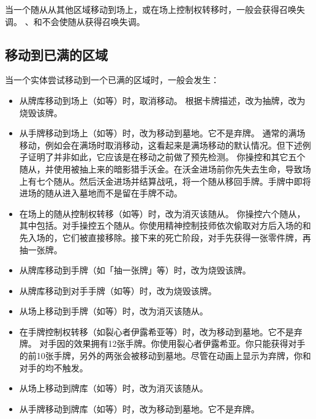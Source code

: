 当一个随从从其他区域移动到场上，或在场上控制权转移时，一般会获得召唤失调。
\exception {}、和不会使随从获得召唤失调。

\subsection{移动到已满的区域}
\label{move-to-full-zone}

当一个实体尝试移动到一个已满的区域时，一般会发生：

\begin{itemize}
    \item 从牌库移动到场上（如等）时，取消移动。
        \exception 根据卡牌描述，改为抽牌，改为烧毁该牌。
    \item 从手牌移动到场上（如等）时，改为移动到墓地。它不是弃牌。
        \notice 通常的满场移动，例如会在满场时取消移动，这看起来是满场移动的默认情况。但下述例子证明了并非如此，它应该是在移动之前做了预先检测。
        \example 你操控和其它五个随从，并使用被抽上来的暗影猎手沃金。在沃金进场前你先失去生命，导致场上有七个随从。然后沃金进场并结算战吼，将一个随从移回手牌。手牌中即将进场的随从进入墓地而不是留在手牌不动。
    \item 在场上的随从控制权转移（如等）时，改为消灭该随从。
    \example 你操控六个随从，其中包括。对手操控五个随从。你使用精神控制技师依次偷取对方后入场的和先入场的，它们被直接移除。接下来的死亡阶段，对手先获得一张零件牌，再抽一张牌。
\end{itemize}

\begin{itemize}
    \item 从牌库移动到手牌（如「抽一张牌」等）时，改为烧毁该牌。
    \item 从牌库移动到对手手牌（如等）时，改为烧毁该牌。
    \item 从场上移动到手牌（如等）时，改为消灭该随从。
    \item 在手牌控制权转移（如裂心者伊露希亚等）时，改为移动到墓地。它不是弃牌。
        \example 对手因的效果拥有12张手牌。你使用裂心者伊露希亚。你只能获得对手的前10张手牌，另外的两张会被移动到墓地。尽管在动画上显示为弃牌，你和对手的均不触发。
\end{itemize}

\begin{itemize}
    \item 从场上移动到牌库（如等）时，改为消灭该随从。
    \item 从手牌移动到牌库（如等）时，改为移动到墓地。它不是弃牌。
\end{itemize}

